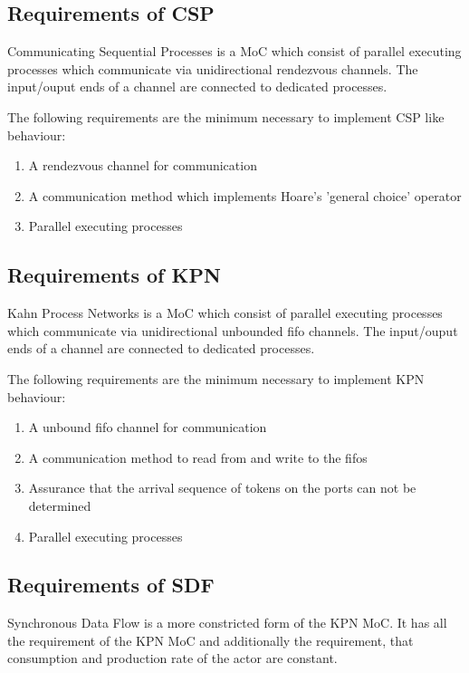 \subsection{Requirements of CSP}
Communicating Sequential Processes \cite{csphoare:1985}
is a MoC which consist of parallel executing processes
which communicate via unidirectional rendezvous channels.
The input/ouput ends of a channel are connected to dedicated
processes.

The following requirements are the minimum necessary to
implement CSP like behaviour:

\begin{enumerate}
\item A rendezvous channel for communication
\item A communication method which implements Hoare's 'general choice' operator \cite{csphoare:1985}
\item Parallel executing processes
\end{enumerate}

\subsection{Requirements of KPN}
Kahn Process Networks \cite{kahn:1974}
is a MoC which consist of parallel executing processes
which communicate via unidirectional unbounded fifo channels.
The input/ouput ends of a channel are connected to dedicated
processes.

The following requirements are the minimum necessary to
implement KPN behaviour:

\begin{enumerate}
\item A unbound fifo channel for communication
\item A communication method to read from and write to the fifos
\item Assurance that the arrival sequence of tokens on
      the ports can not be determined
\item Parallel executing processes
\end{enumerate}

\subsection{Requirements of SDF}
Synchronous Data Flow \cite{sdf:xxx}
is a more constricted form of the KPN MoC.
It has all the requirement of the KPN MoC and
additionally the requirement, that consumption and
production rate of the actor are constant.

